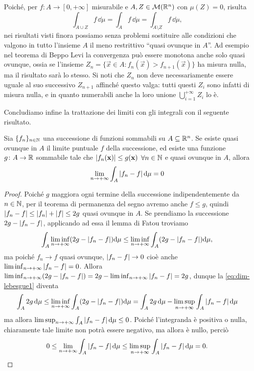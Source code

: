 \begin{osservazione}
	Poich\'e, per $f\colon A\to[0,+\infty]$ misurabile e $A,Z\in\mathcal M(\mathbb{R}^n)$ con $\mu(Z)=0$, risulta
	\begin{equation*}
		\int_{A\cup Z}f\,\dd\mu=\int_Af\,\dd\mu=\int_{A\setminus Z}f\,\dd\mu,
	\end{equation*}
nei risultati visti finora possiamo senza problemi sostituire alle condizioni che valgono in tutto l'insieme $A$ il meno restrittivo ``quasi ovunque in $A$''.
	Ad esempio nel teorema di Beppo Levi la convergenza può essere monotona anche solo quasi ovunque, ossia se l'insieme $Z_n=\{\vec x\in A\colon f_n(\vec x)>f_{n+1}(\vec x)\}$ ha misura nulla, ma il risultato sarà lo stesso.
	Si noti che $Z_n$ non deve necessariamente essere uguale al suo successivo $Z_{n+1}$ affinch\'e questo valga: tutti questi $Z_i$ sono infatti di misura nulla, e in quanto numerabili anche la loro unione $\bigcup_{i=1}^{+\infty}Z_i$ lo è.
\end{osservazione}
Concludiamo infine la trattazione dei limiti con gli integrali con il seguente risultato.
\begin{teorema} \label{t:convergenza-dominata}
	Sia $\{f_n\}_{n\in\mathbb{N}}$ una successione di funzioni sommabili su $A\subseteq\mathbb{R}^n$.
	Se esiste quasi ovunque in $A$ il limite puntuale $f$ della successione, ed esiste una funzione $g\colon A\to\mathbb{R}$ sommabile tale che $\left|{f_n(\mathbf{x})}\right|\leq g(\mathbf{x})$ $\forall n\in\mathbb{N}$ e quasi ovunque in $A$, allora
	\begin{equation}
		\lim_{n\to+\infty}\int_A\left|{f_n-f}\right|\textup{d}\mu=0
		\label{eq:convergenza-dominata}
	\end{equation}
\end{teorema}
\begin{proof}
	Poich\'e $g$ maggiora ogni termine della successione indipendentemente da $n\in\mathbb{N}$, per il teorema di permanenza del segno avremo anche $f\leq g$, quindi $\left|{f_n-f}\right|\leq\left|{f_n}\right|+\left|{f}\right|\leq 2g$ quasi ovunque in $A$.
	Se prendiamo la successione $2g-\left|{f_n-f}\right|$, applicando ad essa il lemma di Fatou troviamo
	\begin{equation}
		\int_A\liminf_{n\to+\infty}(2g-\left|{f_n-f}\right|)\textup{d}\mu\leq\liminf_{n\to+\infty}\int_A(2g-\left|{f_n-f}\right|)\textup{d}\mu,
		\label{eq:dim-lebesgue1}
	\end{equation}
	ma poich\'e $f_n\to f$ quasi ovunque, $\left|{f_n-f}\right|\to 0$ cioè anche $\liminf_{n\to+\infty}\left|{f_n-f}\right|=0$.
	Allora $\liminf_{n\to+\infty}(2g-\left|{f_n-f}\right|)=2g-\liminf_{n\to+\infty}\left|{f_n-f}\right|=2g$, dunque la \eqref{eq:dim-lebesgue1} diventa
	\begin{equation}
		\int_A2g\,\textup{d}\mu\leq\liminf_{n\to+\infty}\int_A(2g-\left|{f_n-f}\right|)\textup{d}\mu=\int_A2g\,\textup{d}\mu-\limsup_{n\to+\infty}\int_A\left|{f_n-f}\right|\textup{d}\mu
	\end{equation}
	ma allora $\limsup_{n\to+\infty}\int_A\left|{f_n-f}\right|\textup{d}\mu\leq 0$.
	Poich\'e l'integranda è positiva o nulla, chiaramente tale limite non potrà essere negativo, ma allora è nullo, perciò
	\begin{equation}
		0\leq\lim_{n\to+\infty}\int_A\left|{f_n-f}\right|\textup{d}\mu\leq\limsup_{n\to+\infty}\int_A\left|{f_n-f}\right|\textup{d}\mu=0.\qedhere
	\end{equation}
\end{proof}
